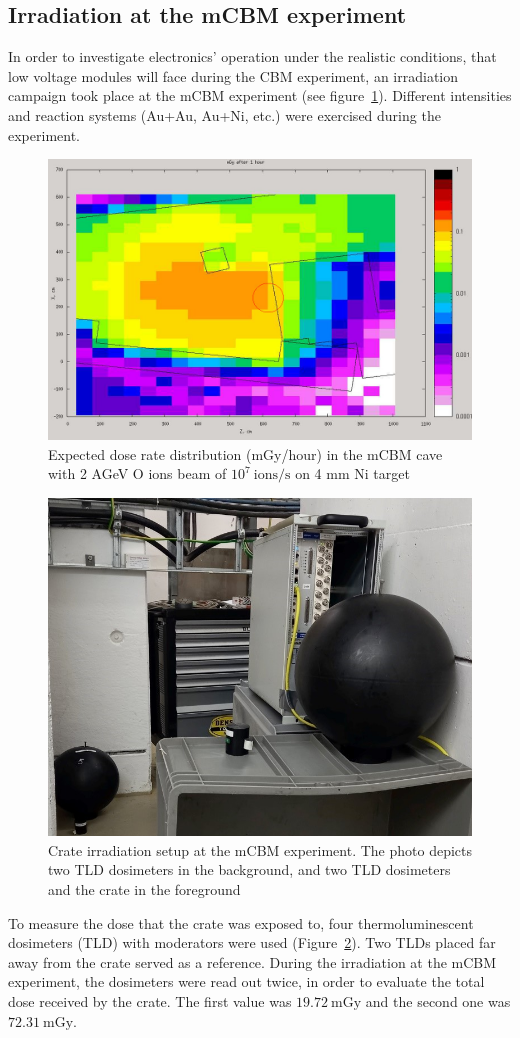 \subsection{Irradiation at the mCBM experiment}
In order to investigate electronics' operation under the realistic conditions, that low voltage modules will face during the CBM experiment, an irradiation campaign took place at the mCBM experiment (see figure~\ref{fig:CBM1}). Different intensities and reaction systems (Au+Au, Au+Ni, etc.) were exercised during the experiment.
\begin{figure}[!h]
    \centering
    \includegraphics[width=0.55\columnwidth]{Chapter4/images/dose1.jpg}
    \caption{Expected dose rate distribution (mGy/hour) in the mCBM cave with 2 AGeV O ions beam of   $10^{7}\mathrm{\ ions/s}$ on 4 mm Ni target}
     \label{fig:CBM1}
\end{figure}
\begin{figure}[!h]
    \centering
    \includegraphics[width=0.4\columnwidth]{Chapter4/images/crate.jpg}
    \caption{Crate irradiation setup at the mCBM experiment. The photo depicts two TLD dosimeters in the background, and two TLD dosimeters and the crate in the foreground}
    \label{fig:crate}
\end{figure}
\newpage
To measure the dose that the crate was exposed to, four thermoluminescent dosimeters (\gls{TLD}) with moderators were used (Figure~\ref{fig:crate}). Two TLDs placed far away from the crate served as a reference. During the irradiation at the mCBM experiment, the dosimeters were read out twice, in order to evaluate the total dose received by the crate. The first value was $19.72\mathrm{\ mGy}$ and  the second one was $72.31\mathrm{\ mGy}$. 

